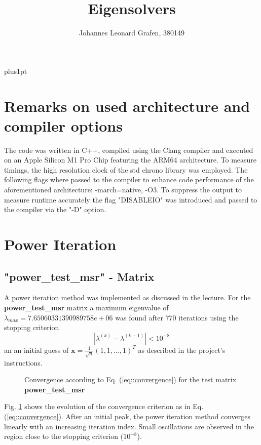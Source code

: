 \documentclass[11pt,a4paper]{article}
\title{Eigensolvers}
\author{Johannes Leonard Grafen, 380149}
\newcommand{\refFig}[1]{Fig. \ref{#1}}
\newcommand{\refEq}[1]{Eq. (\ref{#1})}
\begin{document}
\renewcommand\baselinestretch{1.0}
\baselineskip=18pt plus1pt	

\maketitle
\newpage
{}
\tableofcontents
\listoffigures	%
\listoftables  %
\newpage

\section{Remarks on used architecture and compiler options}
The code was written in C++, compiled using the Clang compiler and executed on an Apple Silicon M1 Pro Chip featuring the ARM64 architecture. To measure timings, the high resolution clock of the std chrono library was employed. The following flags where passed to the compiler to enhance code performance of the aforementioned architecture: -march=native, -O3. To suppress the output to measure runtime accurately the flag "DISABLEIO" was introduced and passed to the compiler via the "-D" option.

\section{Power Iteration}
\subsection{"{power\_test\_msr}" - Matrix}
A power iteration method was implemented as discussed in the lecture. For the \textbf{power\_test\_msr} matrix a maximum eigenvalue of $\lambda_{max} = 7.65060331390989758e+06$ was found after 770 iterations using the stopping criterion 
\begin{equation}
	|\lambda^{(k)} - \lambda^{(k-1)}| < 10^{-8}
	\label{eq::convergence}
\end{equation}
an an initial guess of $\mathbf{x} = \frac{1}{\sqrt{n}} (1,1, ..., 1)^T$ as described in the project's instructions. 
\begin{figure}[!htbp]
	\centering
	\hspace*{0.8cm}
	\leavevmode
	\resizebox{0.9\width}{!}{}
	\caption{Convergence according to \refEq{eq::convergence} for the test matrix \textbf{power\_test\_msr}}
	\label{fig::convTest}
\end{figure}

\refFig{fig::convTest} shows the evolution of the convergence criterion as in \refEq{eq::convergence}. After an initial peak, the power iteration method converges linearly with an increasing iteration index. Small oscillations are observed in the region close to the stopping criterion ($10^{-8}$).
\end{document}
